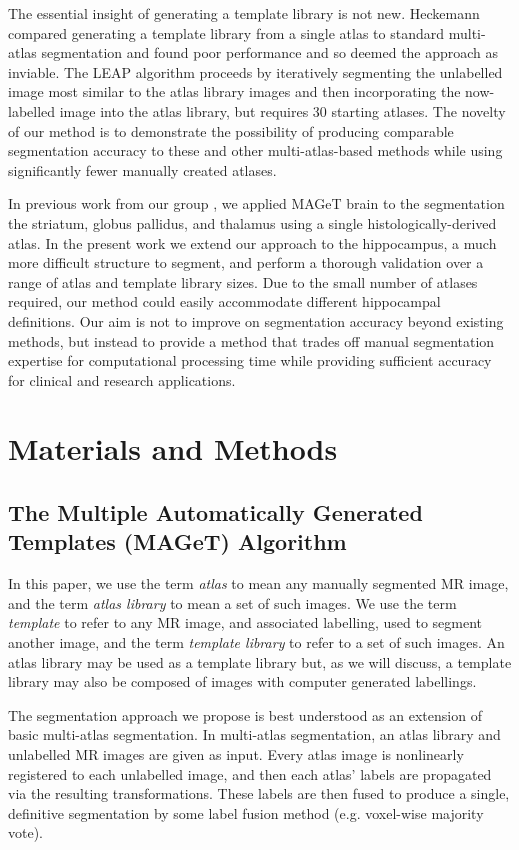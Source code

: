 \documentclass{article}\usepackage{graphicx, color}
\begin{document}
The essential insight of generating a template library is not new.  Heckemann
\cite{Heckemann2006} compared generating a template library from a single atlas
to standard multi-atlas segmentation and found poor performance and so deemed
the approach as inviable.  The LEAP algorithm \cite{Wolz2010} proceeds by
iteratively segmenting the unlabelled image most similar to the atlas library
images and then incorporating the now-labelled image into the atlas library,
but requires 30 starting atlases.  The novelty of our method is to demonstrate
the possibility of producing comparable segmentation accuracy to these and
other multi-atlas-based methods while using significantly fewer manually
created atlases.

In previous work from our group \cite{Chakravarty2012}, we applied MAGeT brain
to the segmentation the striatum, globus pallidus, and thalamus using a single
histologically-derived atlas. In the present work we extend our approach to the
hippocampus, a much more difficult structure to segment, and perform a thorough
validation over a range of atlas and template library sizes. Due to the small
number of atlases required, our method could easily accommodate different
hippocampal definitions. Our aim is not to improve on segmentation accuracy
beyond existing methods, but instead to provide a method that trades off manual
segmentation expertise for computational processing time while providing
sufficient accuracy for clinical and research applications.


\section{Materials and Methods} 
\subsection{The Multiple Automatically Generated Templates (MAGeT) Algorithm}

In this paper, we use the term {\it atlas} to mean any manually segmented MR
image, and the term {\it atlas library} to mean a set of such images.  We use
the term {\it template} to refer to any MR image, and associated labelling,
used to segment another image, and the term {\it template library} to refer to
a set of such images.  An atlas library may be used as a template library but,
as we will discuss, a template library may also be composed of images with
computer generated labellings. 

The segmentation approach we propose is best understood as an extension of
basic multi-atlas segmentation\cite{Collins2010}.  In multi-atlas segmentation,
an atlas library and unlabelled MR images are given as input.  Every atlas
image is nonlinearly registered to each unlabelled image, and then each atlas'
labels are propagated via the resulting transformations.  These labels are then
fused to produce a single, definitive segmentation by some label fusion method
(e.g.  voxel-wise majority vote). 
\end{document}
